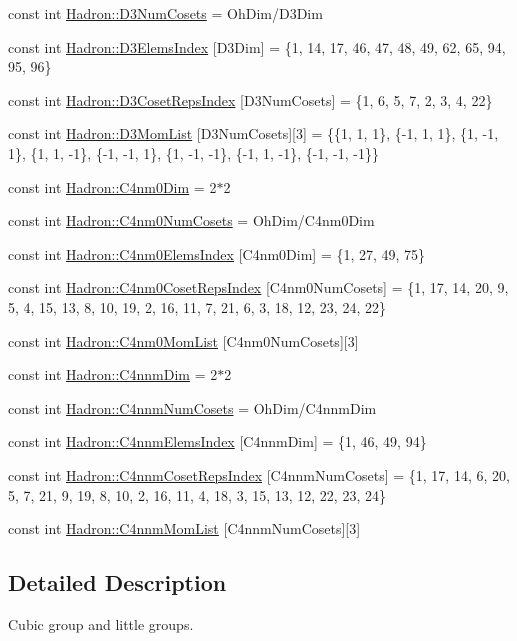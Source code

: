 \begin{DoxyCompactItemize}
\item 
const int \mbox{\hyperlink{namespaceHadron_a495e958948d0b6cdeb09a3f94e11c014}{Hadron\+::\+D3\+Num\+Cosets}} = Oh\+Dim/D3\+Dim
\item 
const int \mbox{\hyperlink{namespaceHadron_a222de40612665f1829700d29a3f27eae}{Hadron\+::\+D3\+Elems\+Index}} \mbox{[}D3\+Dim\mbox{]} = \{1, 14, 17, 46, 47, 48, 49, 62, 65, 94, 95, 96\}
\item 
const int \mbox{\hyperlink{namespaceHadron_a9bef0e0898639097c24679733aa4d9ac}{Hadron\+::\+D3\+Coset\+Reps\+Index}} \mbox{[}D3\+Num\+Cosets\mbox{]} = \{1, 6, 5, 7, 2, 3, 4, 22\}
\item 
const int \mbox{\hyperlink{namespaceHadron_a704848c20f046c1a4918279e713ec12a}{Hadron\+::\+D3\+Mom\+List}} \mbox{[}D3\+Num\+Cosets\mbox{]}\mbox{[}3\mbox{]} = \{\{1, 1, 1\}, \{-\/1, 1, 1\}, \{1, -\/1, 1\}, \{1, 1, -\/1\}, \{-\/1, -\/1, 1\}, \{1, -\/1, -\/1\}, \{-\/1, 1, -\/1\}, \{-\/1, -\/1, -\/1\}\}
\item 
const int \mbox{\hyperlink{namespaceHadron_afdf5d754d40795de402712dfe4fa0ab7}{Hadron\+::\+C4nm0\+Dim}} = 2$\ast$2
\item 
const int \mbox{\hyperlink{namespaceHadron_a8e76f646995d145588abe6831d8e9041}{Hadron\+::\+C4nm0\+Num\+Cosets}} = Oh\+Dim/C4nm0\+Dim
\item 
const int \mbox{\hyperlink{namespaceHadron_aa91371705a6f56faa960ddfffb4d9ac3}{Hadron\+::\+C4nm0\+Elems\+Index}} \mbox{[}C4nm0\+Dim\mbox{]} = \{1, 27, 49, 75\}
\item 
const int \mbox{\hyperlink{namespaceHadron_a4c7ee5beb68f90860442a2a1567ee9bd}{Hadron\+::\+C4nm0\+Coset\+Reps\+Index}} \mbox{[}C4nm0\+Num\+Cosets\mbox{]} = \{1, 17, 14, 20, 9, 5, 4, 15, 13, 8, 10, 19, 2, 16, 11, 7, 21, 6, 3, 18, 12, 23, 24, 22\}
\item 
const int \mbox{\hyperlink{namespaceHadron_a09e727ed9485ae1b66ca52813ac86201}{Hadron\+::\+C4nm0\+Mom\+List}} \mbox{[}C4nm0\+Num\+Cosets\mbox{]}\mbox{[}3\mbox{]}
\item 
const int \mbox{\hyperlink{namespaceHadron_af60ad76cc44b9d853ae699af88a1a5cb}{Hadron\+::\+C4nnm\+Dim}} = 2$\ast$2
\item 
const int \mbox{\hyperlink{namespaceHadron_a016c7cde3e8e01232fb1cfc3db8d8b54}{Hadron\+::\+C4nnm\+Num\+Cosets}} = Oh\+Dim/C4nnm\+Dim
\item 
const int \mbox{\hyperlink{namespaceHadron_a6352bd80b67b77534019070d2e8ada82}{Hadron\+::\+C4nnm\+Elems\+Index}} \mbox{[}C4nnm\+Dim\mbox{]} = \{1, 46, 49, 94\}
\item 
const int \mbox{\hyperlink{namespaceHadron_a45efc71874946f8e0f89c14717a06a68}{Hadron\+::\+C4nnm\+Coset\+Reps\+Index}} \mbox{[}C4nnm\+Num\+Cosets\mbox{]} = \{1, 17, 14, 6, 20, 5, 7, 21, 9, 19, 8, 10, 2, 16, 11, 4, 18, 3, 15, 13, 12, 22, 23, 24\}
\item 
const int \mbox{\hyperlink{namespaceHadron_a2ec1cded04eb336aa68867febe1878cb}{Hadron\+::\+C4nnm\+Mom\+List}} \mbox{[}C4nnm\+Num\+Cosets\mbox{]}\mbox{[}3\mbox{]}
\end{DoxyCompactItemize}


\subsection{Detailed Description}
Cubic group and little groups. 

